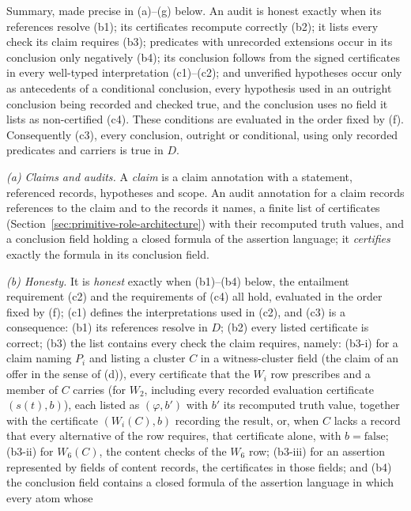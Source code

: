 \begin{definition}\label{def:audited}
Summary, made precise in (a)--(g) below. An audit is honest exactly when its
references resolve (b1); its certificates recompute correctly (b2); it lists
every check its claim requires (b3); predicates with unrecorded extensions
occur in its conclusion only negatively (b4); its conclusion follows from the
signed certificates in every well-typed interpretation (c1)--(c2); and
unverified hypotheses occur only as antecedents of a conditional conclusion,
every hypothesis used in an outright conclusion being recorded and checked
true, and the conclusion uses no field it lists as non-certified (c4). These
conditions are evaluated in the order fixed by (f). Consequently (c3), every conclusion, outright or conditional, using only recorded predicates and carriers is true in
\(D\).
\par \emph{(a) Claims and audits.} A \emph{claim} is a claim annotation with a statement, referenced records,
hypotheses and scope. An audit annotation for a claim records references to
the claim and to the records it names, a finite list of certificates
(Section~\ref{sec:primitive-role-architecture}) with their recomputed truth
values, and a conclusion field holding a closed formula of the assertion language;
it \emph{certifies} exactly the formula in its conclusion field. \par\emph{(b) Honesty.} It is
\emph{honest} exactly when (b1)--(b4) below, the entailment requirement (c2)
and the requirements of (c4) all hold, evaluated in the order fixed by (f);
(c1) defines the interpretations used in (c2), and (c3) is a consequence:
(b1) its references resolve in \(D\); (b2) every listed
certificate is correct; (b3) the list contains every check the claim requires,
namely: (b3-i) for a claim naming \(P_i\) and listing a cluster \(C\) in a
witness-cluster field (the claim of an offer in the sense of (d)), every certificate that the \(W_i\) row prescribes and a member of \(C\) carries (for \(W_2\), including every recorded evaluation certificate \((s(t),b)\)), each listed as \((\varphi,b')\) with \(b'\) its recomputed truth value, together with the certificate \((W_i(C),b)\) recording
the result, or, when \(C\) lacks a record that every alternative of the row requires, that certificate
alone, with \(b=\mathrm{false}\); (b3-ii) for \(W_6(C)\), the content checks of the
\(W_6\) row; (b3-iii) for an assertion represented by fields of content records, the
certificates in those fields; and (b4) the conclusion field contains a closed formula of the assertion language in which every atom whose

\end{definition}
